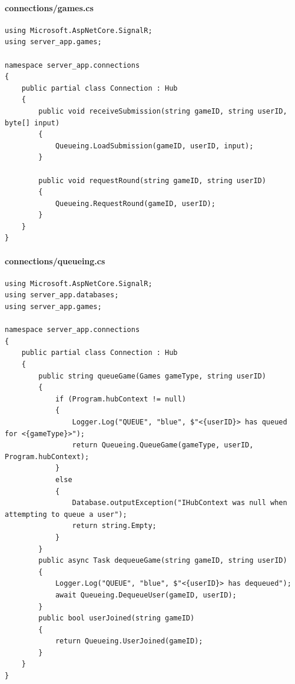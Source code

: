 \documentclass{article}
\begin{document}
\paragraph{connections/games.cs}\label{server/connections/games.cs}
\begin{verbatim}
using Microsoft.AspNetCore.SignalR;
using server_app.games;

namespace server_app.connections
{
	public partial class Connection : Hub
	{
		public void receiveSubmission(string gameID, string userID, byte[] input)
		{
			Queueing.LoadSubmission(gameID, userID, input);
		}

		public void requestRound(string gameID, string userID)
		{
			Queueing.RequestRound(gameID, userID);
		}
	}
}
\end{verbatim}
\paragraph{connections/queueing.cs}\label{server/connections/queueing.cs}
\begin{verbatim}
using Microsoft.AspNetCore.SignalR;
using server_app.databases;
using server_app.games;

namespace server_app.connections
{
	public partial class Connection : Hub
	{
		public string queueGame(Games gameType, string userID)
		{
			if (Program.hubContext != null)
			{
				Logger.Log("QUEUE", "blue", $"<{userID}> has queued for <{gameType}>");
				return Queueing.QueueGame(gameType, userID, Program.hubContext);
			}
			else
			{
				Database.outputException("IHubContext was null when attempting to queue a user");
				return string.Empty;
			}
		}
		public async Task dequeueGame(string gameID, string userID)
		{
			Logger.Log("QUEUE", "blue", $"<{userID}> has dequeued");
			await Queueing.DequeueUser(gameID, userID);
		}
		public bool userJoined(string gameID)
		{
			return Queueing.UserJoined(gameID);
		}
	}
}
\end{verbatim}
\end{document}
